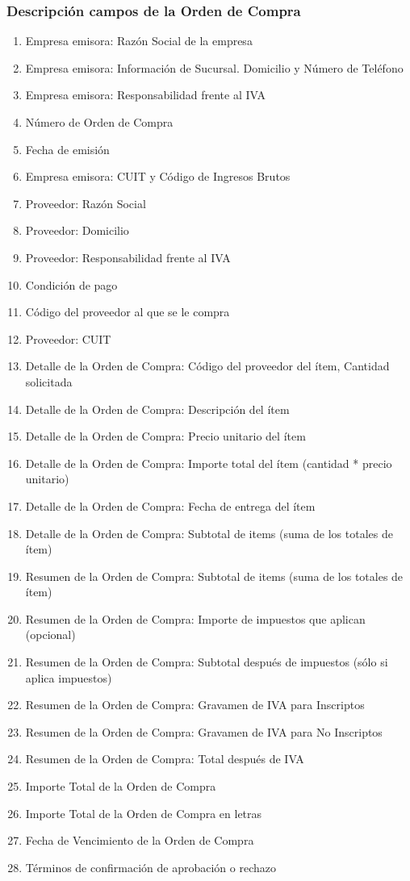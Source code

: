 \subsubsection{Descripci\'on campos de la Orden de Compra}
\begin{enumerate}
  \item Empresa emisora: Raz\'on Social de la empresa
  \item Empresa emisora: Informaci\'on de Sucursal. Domicilio y N\'umero de Tel\'efono
  \item Empresa emisora: Responsabilidad frente al IVA
  \item Número de Orden de Compra
  \item Fecha de emisi\'on
  \item Empresa emisora: CUIT y C\'odigo de Ingresos Brutos
  \item Proveedor: Raz\'on Social 
  \item Proveedor: Domicilio
  \item Proveedor: Responsabilidad frente al IVA
  \item Condici\'on de pago
  \item C\'odigo del proveedor al que se le compra
  \item Proveedor: CUIT
  \item Detalle de la Orden de Compra: C\'odigo del proveedor del \'item, Cantidad solicitada
  \item Detalle de la Orden de Compra: Descripci\'on del \'item
  \item Detalle de la Orden de Compra: Precio unitario del \'item
  \item Detalle de la Orden de Compra: Importe total del \'item (cantidad * precio unitario)
  \item Detalle de la Orden de Compra: Fecha de entrega del \'item
  \item Detalle de la Orden de Compra: Subtotal de items (suma de los totales de \'item)
  \item Resumen de la Orden de Compra: Subtotal de items (suma de los totales de \'item)
  \item Resumen de la Orden de Compra: Importe de impuestos que aplican (opcional)
  \item Resumen de la Orden de Compra: Subtotal después de impuestos (sólo si aplica impuestos)
  \item Resumen de la Orden de Compra: Gravamen de IVA para Inscriptos
  \item Resumen de la Orden de Compra: Gravamen de IVA para No Inscriptos
  \item Resumen de la Orden de Compra: Total después de IVA
  \item Importe Total de la Orden de Compra
  \item Importe Total de la Orden de Compra en letras
  \item Fecha de Vencimiento de la Orden de Compra
  \item Términos de confirmación de aprobación o rechazo
\end{enumerate}

